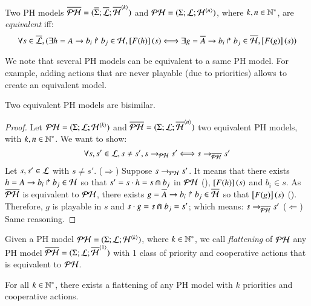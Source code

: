 


\begin{definition}\label{def:equiv}
  Two PH models $\overline{\mathcal{PH}} = (\overline{\Sigma}; \overline{\mathcal{L}}; \overline{\mathcal{H}}^{\langle k \rangle})$ and $\mathcal{PH} = (\Sigma; \mathcal{L}; \mathcal{H}^{\langle n \rangle})$,
  where $k, n \in \mathbb{N}^*$,
  are \emph{equivalent} iff:
  $$\forall s \in \overline{\mathcal{L}}, ( \exists h = A\rightarrow b_i\Rsh b_j \in \mathcal{H}, \left[F(h)\right](s)
    \Longleftrightarrow \exists g = \overline{A}\rightarrow b_i\Rsh b_j \in \overline{\mathcal{H}}, \left[F(g)\right](s) )$$
\end{definition}

We note that several PH models can be equivalent to a same PH model.
For example, adding actions that are never playable (due to priorities) allows to create an equivalent model.

\begin{theorem}
  Two equivalent PH models are bisimilar.
\end{theorem}

\begin{proof}
  Let $\mathcal{PH} = (\Sigma; \mathcal{L}; \mathcal{H}^{\langle k \rangle})$ and $\overline{\mathcal{PH}} = (\Sigma; \mathcal{L}; \overline{\mathcal{H}}^{\langle n \rangle})$
  two equivalent PH models, with $k, n \in \mathbb{N}^*$.
  We want to show:
  $$\forall s, s' \in \mathcal{L}, s \neq s', s \rightarrow_{\mathcal{PH}} s' \Longleftrightarrow s \rightarrow_{\overline{\mathcal{PH}}} s' $$
  Let $s, s' \in \mathcal{L}$ with $s \neq s'$.
  ($\Rightarrow$) Suppose $s \rightarrow_{\mathcal{PH}} s'$.
  It means that there exists $h = A\rightarrow b_i\Rsh b_j \in \mathcal{H}$ so that $s' = s \cdot h = s \Cap b_j$
  in $\mathcal{PH}$ (), \ie $\left[F(h)\right](s)$ and $b_i \in s$.
  As $\overline{\mathcal{PH}}$ is equivalent to $\mathcal{PH}$,
  there exists $g = \overline{A}\rightarrow b_i\Rsh b_j \in \overline{\mathcal{H}}$ so that $\left[F(g)\right](s)$ ().
  Therefore, $g$ is playable in $s$ and $s \cdot g = s \Cap b_j = s'$;
  which means: $s \rightarrow_{\overline{\mathcal{PH}}} s'$
  ($\Leftarrow$) Same reasoning.
\end{proof}

\begin{definition}[Flattening]
  Given a PH model $\mathcal{PH} = (\Sigma; \mathcal{L}; \mathcal{H}^{\langle k \rangle})$, where $k \in \mathbb{N}^*$,
  we call \emph{flattening} of $\mathcal{PH}$ any PH model $\overline{\mathcal{PH}} = (\Sigma; \mathcal{L}; \overline{\mathcal{H}}^{\langle 1 \rangle})$
  with 1 class of priority and cooperative actions that is equivalent to $\mathcal{PH}$.
\end{definition}

\begin{theorem}\label{th:exists-flattening}
  For all $k \in \mathbb{N}^*$, there exists a flattening of any PH model with $k$ priorities and cooperative actions.
\end{theorem}

